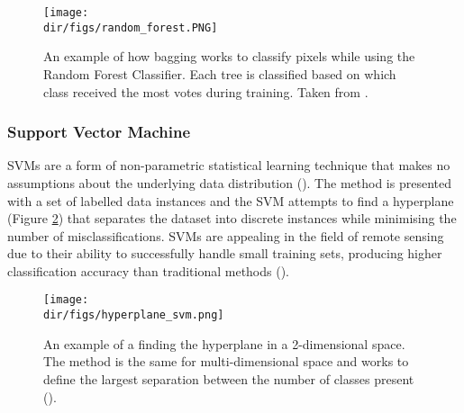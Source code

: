 \begin{figure}[htpb]
    \centering
    \texttt{[image: \\dir/figs/random\_forest.PNG]}
    \caption[An example of classifying using Random Forests]{An example of how bagging works to classify pixels while using the Random Forest Classifier. Each tree is classified based on which class received the most votes during training. Taken from \citet{belgiu16}.}
    \label{fig.random_forest}
\end{figure}
\subsubsection{Support Vector Machine}
SVMs are a form of non-parametric statistical learning technique that makes no assumptions about the underlying data distribution (\cite{vapnik82}). The method is presented with a set of labelled data instances and the SVM attempts to find a hyperplane (Figure \ref{fig.svm_hyperplane}) that separates the dataset into discrete instances while minimising the number of misclassifications. SVMs are appealing in the field of remote sensing due to their ability to successfully handle small training sets, producing higher classification accuracy than traditional methods (\cite{cortes95}).
\begin{figure}[htpb]
    \centering
    \texttt{[image: \\dir/figs/hyperplane\_svm.png]}
    \caption[An example of finding the hyperplane for Support Vector Machine Learning]{An example of a finding the hyperplane in a 2-dimensional space. The method is the same for multi-dimensional space and works to define the largest separation between the number of classes present (\cite{cortes95}).}
    \label{fig.svm_hyperplane}
\end{figure}
